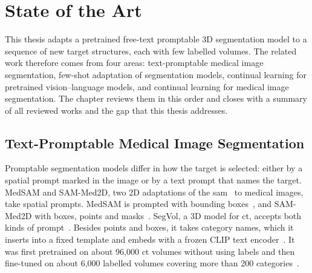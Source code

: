 %
%

\chapter{State of the Art}
\label{chap:sota}

This thesis adapts a pretrained free-text promptable 3D segmentation model to a sequence of new target structures, each with few labelled volumes.
The related work therefore comes from four areas: text-promptable medical image segmentation, few-shot adaptation of segmentation models, continual learning for pretrained vision--language models, and continual learning for medical image segmentation.
The chapter reviews them in this order and closes with a summary of all reviewed works and the gap that this thesis addresses.

\section{Text-Promptable Medical Image Segmentation}
\label{sec:text-promptable-seg}

Promptable segmentation models differ in how the target is selected: either by a spatial prompt marked in the image or by a text prompt that names the target.
MedSAM and SAM-Med2D, two 2D adaptations of the \gls{sam}~\cite{Kirillov_2023_ICCV} to medical images, take spatial prompts.
MedSAM is prompted with bounding boxes~\cite{Ma_2024}, and SAM-Med2D with boxes, points and masks~\cite{cheng2023sammed2d}.
SegVol, a 3D model for \gls{ct}, accepts both kinds of prompt~\cite{du2025segvoluniversalinteractivevolumetric}.
Besides points and boxes, it takes category names, which it inserts into a fixed template and embeds with a frozen CLIP text encoder~\cite{radford2021learningtransferablevisualmodels,du2025segvoluniversalinteractivevolumetric}.
It was first pretrained on about 96{,}000 \gls{ct} volumes without using labels and then fine-tuned on about 6{,}000 labelled volumes covering more than 200 categories~\cite{du2025segvoluniversalinteractivevolumetric}.


